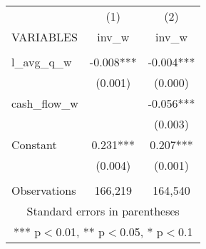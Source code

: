 \documentclass[]{article}
\begin{document}
\begin{tabular}{lcc} \hline
 & (1) & (2) \\
VARIABLES & inv\_w & inv\_w \\ \hline
 &  &  \\
l\_avg\_q\_w & -0.008*** & -0.004*** \\
 & (0.001) & (0.000) \\
cash\_flow\_w &  & -0.056*** \\
 &  & (0.003) \\
Constant & 0.231*** & 0.207*** \\
 & (0.004) & (0.001) \\
 &  &  \\
 Observations & 166,219 & 164,540 \\ \hline
\multicolumn{3}{c}{ Standard errors in parentheses} \\
\multicolumn{3}{c}{ *** p$<$0.01, ** p$<$0.05, * p$<$0.1} \\
\end{tabular}
\end{document}
